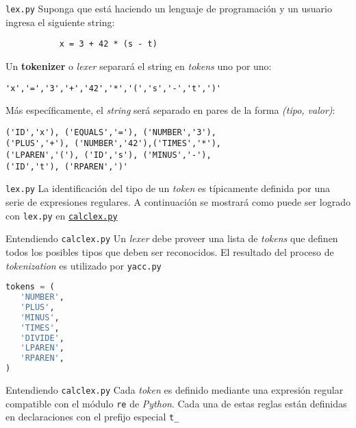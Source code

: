 \documentclass[pdf]{beamer}
\begin{document}
\begin{frame}[fragile]{\texttt{lex.py}}
Suponga que está haciendo un lenguaje de programación y un usuario ingresa el siguiente string:

\begin{lstlisting}
           x = 3 + 42 * (s - t)
\end{lstlisting}

Un \textbf{tokenizer} o \emph{lexer} separará el string en \emph{tokens} uno por uno:

\begin{lstlisting}
'x','=','3','+','42','*','(','s','-','t',')'
\end{lstlisting}

Más específicamente, el \emph{string} será separado en pares de la forma \emph{(tipo, valor)}:

\begin{lstlisting}
('ID','x'), ('EQUALS','='), ('NUMBER','3'), 
('PLUS','+'), ('NUMBER','42'),('TIMES','*'),
('LPAREN','('), ('ID','s'), ('MINUS','-'),
('ID','t'), ('RPAREN',')'
\end{lstlisting}

\end{frame}
	
	\begin{frame}{{\texttt{lex.py}}}
		La identificación del tipo de un \emph{token} es típicamente definida por una serie de expresiones regulares. A continuación se mostrará como puede ser logrado con \texttt{lex.py} en \href{run:calclex.py}{\texttt{calclex.py}}
	\end{frame}
	
\begin{frame}[fragile]{Entendiendo \texttt{calclex.py}}
\justifying
Un \emph{lexer} debe proveer una lista de \emph{tokens} que definen todos los posibles tipos que deben ser reconocidos. El resultado del proceso de \emph{tokenization} es utilizado por \texttt{yacc.py}

\begin{example}
\begin{lstlisting}[language=Python]
tokens = (
   'NUMBER',
   'PLUS',
   'MINUS',
   'TIMES',
   'DIVIDE',
   'LPAREN',
   'RPAREN',
)
\end{lstlisting}			
\end{example}

\end{frame}

\begin{frame}{Entendiendo \texttt{calclex.py}}
	Cada \emph{token} es definido mediante una expresión regular compatible con el módulo \texttt{re} de \emph{Python}. Cada una de estas reglas están definidas en declaraciones con el prefijo especial \texttt{t\_}
\end{frame}
\end{document}
